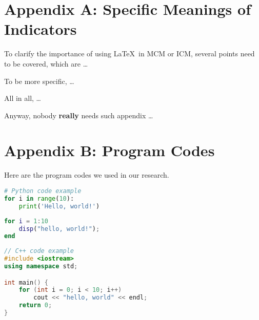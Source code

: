\documentclass[12pt]{article}  %
\begin{document}
\begin{subappendices}  %
\section{Appendix A: Specific Meanings of Indicators}
\label{a1}
To clarify the importance of using \LaTeX\ in MCM or ICM, several points need to be covered, which are \ldots

To be more specific, \ldots

All in all, \ldots

Anyway, nobody \textbf{really} needs such appendix \ldots

\section{Appendix B: Program Codes}
Here are the program codes we used in our research.


\begin{lstlisting}[language=Python, name={test.py}]
# Python code example
for i in range(10):
    print('Hello, world!')
\end{lstlisting}

\begin{lstlisting}[language=MATLAB, name={test.m}]
% MATLAB code example
for i = 1:10
    disp("hello, world!");
end
\end{lstlisting}

\begin{lstlisting}[language=C++, name={test.cpp}]
// C++ code example
#include <iostream>
using namespace std;

int main() {
    for (int i = 0; i < 10; i++)
        cout << "hello, world" << endl;
    return 0;
}
\end{lstlisting}

\end{subappendices}  %
\end{document}
